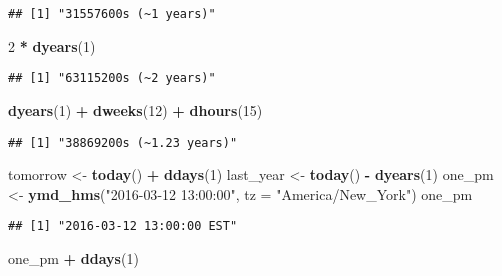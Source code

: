 \documentclass[
]{article}
\newenvironment{Shaded}{\begin{snugshade}}{\end{snugshade}}
\newcommand{\AttributeTok}[1]{\textcolor[rgb]{0.13,0.29,0.53}{#1}}
\newcommand{\DecValTok}[1]{\textcolor[rgb]{0.00,0.00,0.81}{#1}}
\newcommand{\FunctionTok}[1]{\textcolor[rgb]{0.13,0.29,0.53}{\textbf{#1}}}
\newcommand{\NormalTok}[1]{#1}
\newcommand{\OtherTok}[1]{\textcolor[rgb]{0.56,0.35,0.01}{#1}}
\newcommand{\SpecialCharTok}[1]{\textcolor[rgb]{0.81,0.36,0.00}{\textbf{#1}}}
\newcommand{\StringTok}[1]{\textcolor[rgb]{0.31,0.60,0.02}{#1}}
\begin{document}
\begin{verbatim}
## [1] "31557600s (~1 years)"
\end{verbatim}

\begin{Shaded}
\begin{Highlighting}[]
\DecValTok{2} \SpecialCharTok{*} \FunctionTok{dyears}\NormalTok{(}\DecValTok{1}\NormalTok{)}
\end{Highlighting}
\end{Shaded}

\begin{verbatim}
## [1] "63115200s (~2 years)"
\end{verbatim}

\begin{Shaded}
\begin{Highlighting}[]
\FunctionTok{dyears}\NormalTok{(}\DecValTok{1}\NormalTok{) }\SpecialCharTok{+} \FunctionTok{dweeks}\NormalTok{(}\DecValTok{12}\NormalTok{) }\SpecialCharTok{+} \FunctionTok{dhours}\NormalTok{(}\DecValTok{15}\NormalTok{)}
\end{Highlighting}
\end{Shaded}

\begin{verbatim}
## [1] "38869200s (~1.23 years)"
\end{verbatim}

\begin{Shaded}
\begin{Highlighting}[]
\NormalTok{tomorrow }\OtherTok{\textless{}{-}} \FunctionTok{today}\NormalTok{() }\SpecialCharTok{+} \FunctionTok{ddays}\NormalTok{(}\DecValTok{1}\NormalTok{)}
\NormalTok{last\_year }\OtherTok{\textless{}{-}} \FunctionTok{today}\NormalTok{() }\SpecialCharTok{{-}} \FunctionTok{dyears}\NormalTok{(}\DecValTok{1}\NormalTok{)}
\NormalTok{one\_pm }\OtherTok{\textless{}{-}} \FunctionTok{ymd\_hms}\NormalTok{(}\StringTok{"2016{-}03{-}12 13:00:00"}\NormalTok{, }\AttributeTok{tz =} \StringTok{"America/New\_York"}\NormalTok{)}
\NormalTok{one\_pm}
\end{Highlighting}
\end{Shaded}

\begin{verbatim}
## [1] "2016-03-12 13:00:00 EST"
\end{verbatim}

\begin{Shaded}
\begin{Highlighting}[]
\NormalTok{one\_pm }\SpecialCharTok{+} \FunctionTok{ddays}\NormalTok{(}\DecValTok{1}\NormalTok{)}
\end{Highlighting}
\end{Shaded}
\end{document}
